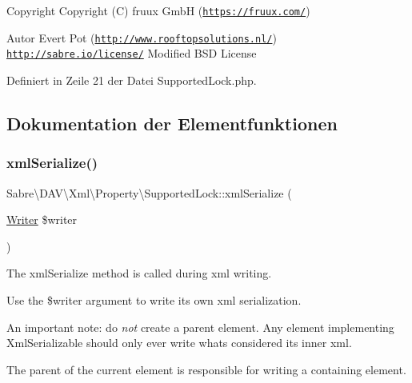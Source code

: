 \begin{DoxyCopyright}{Copyright}
Copyright (C) fruux GmbH (\href{https://fruux.com/}{\tt https\+://fruux.\+com/}) 
\end{DoxyCopyright}
\begin{DoxyAuthor}{Autor}
Evert Pot (\href{http://www.rooftopsolutions.nl/}{\tt http\+://www.\+rooftopsolutions.\+nl/})  \href{http://sabre.io/license/}{\tt http\+://sabre.\+io/license/} Modified B\+SD License 
\end{DoxyAuthor}


Definiert in Zeile 21 der Datei Supported\+Lock.\+php.



\subsection{Dokumentation der Elementfunktionen}
\mbox{\label{class_sabre_1_1_d_a_v_1_1_xml_1_1_property_1_1_supported_lock_a0d0f874b272baaee90e2b8dc6da386da}} 
\subsubsection{\texorpdfstring{xml\+Serialize()}{xmlSerialize()}}
{\footnotesize\ttfamily Sabre\textbackslash{}\+D\+A\+V\textbackslash{}\+Xml\textbackslash{}\+Property\textbackslash{}\+Supported\+Lock\+::xml\+Serialize (\begin{DoxyParamCaption}\item[{\mbox{\hyperlink{class_sabre_1_1_xml_1_1_writer}{Writer}}}]{\$writer }\end{DoxyParamCaption})}

The xml\+Serialize method is called during xml writing.

Use the \$writer argument to write its own xml serialization.

An important note\+: do {\itshape not} create a parent element. Any element implementing Xml\+Serializable should only ever write what\textquotesingle{}s considered its \textquotesingle{}inner xml\textquotesingle{}.

The parent of the current element is responsible for writing a containing element.

